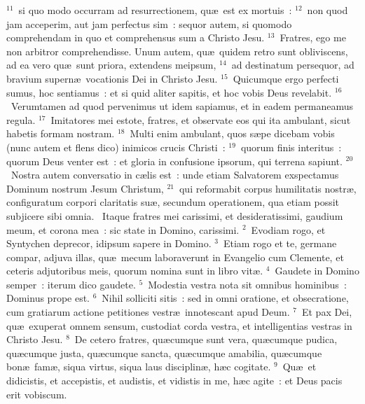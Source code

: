 ${}^{11}$~si quo modo occurram ad resurrectionem, qu\ae\ est ex mortuis~:
${}^{12}$~non quod jam acceperim, aut jam perfectus sim~: sequor autem, si quomodo comprehendam in quo et comprehensus sum a Christo Jesu.
${}^{13}$~Fratres, ego me non arbitror comprehendisse. Unum autem, qu\ae\ quidem retro sunt obliviscens, ad ea vero qu\ae\ sunt priora, extendens meipsum,
${}^{14}$~ad destinatum persequor, ad bravium supern\ae\ vocationis Dei in Christo Jesu.
${}^{15}$~Quicumque ergo perfecti sumus, hoc sentiamus~: et si quid aliter sapitis, et hoc vobis Deus revelabit.
${}^{16}$~Verumtamen ad quod pervenimus ut idem sapiamus, et in eadem permaneamus regula.
${}^{17}$~Imitatores mei estote, fratres, et observate eos qui ita ambulant, sicut habetis formam nostram.
${}^{18}$~Multi enim ambulant, quos s\ae pe dicebam vobis (nunc autem et flens dico) inimicos crucis Christi~:
${}^{19}$~quorum finis interitus~: quorum Deus venter est~: et gloria in confusione ipsorum, qui terrena sapiunt.
${}^{20}$~Nostra autem conversatio in c\ae lis est~: unde etiam Salvatorem exspectamus Dominum nostrum Jesum Christum,
${}^{21}$~qui reformabit corpus humilitatis nostr\ae , configuratum corpori claritatis su\ae , secundum operationem, qua etiam possit subjicere sibi omnia.
~\lettrine[lines=10,image=true,loversize=0.05,lraise=-0.03]{I}{}taque fratres mei carissimi, et desideratissimi, gaudium meum, et corona mea~: sic state in Domino, carissimi.
${}^{2}$~Evodiam rogo, et Syntychen deprecor, idipsum sapere in Domino.
${}^{3}$~Etiam rogo et te, germane compar, adjuva illas, qu\ae\ mecum laboraverunt in Evangelio cum Clemente, et ceteris adjutoribus meis, quorum nomina sunt in libro vit\ae .
${}^{4}$~Gaudete in Domino semper~: iterum dico gaudete.
${}^{5}$~Modestia vestra nota sit omnibus hominibus~: Dominus prope est.
${}^{6}$~Nihil solliciti sitis~: sed in omni oratione, et obsecratione, cum gratiarum actione petitiones vestr\ae\ innotescant apud Deum.
${}^{7}$~Et pax Dei, qu\ae\ exuperat omnem sensum, custodiat corda vestra, et intelligentias vestras in Christo Jesu.
${}^{8}$~De cetero fratres, qu\ae cumque sunt vera, qu\ae cumque pudica, qu\ae cumque justa, qu\ae cumque sancta, qu\ae cumque amabilia, qu\ae cumque bon\ae\ fam\ae , siqua virtus, siqua laus disciplin\ae , h\ae c cogitate.
${}^{9}$~Qu\ae\ et didicistis, et accepistis, et audistis, et vidistis in me, h\ae c agite~: et Deus pacis erit vobiscum.


